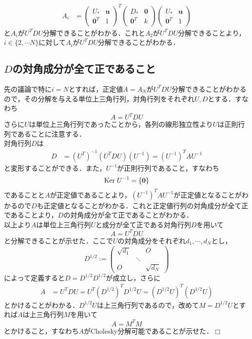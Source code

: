 \documentclass{jsarticle}
\theoremstyle{definition}
\theoremstyle{mystyle} %
\def\qed{\hfill$\Box$}
\begin{document}
\begin{align*}
A_i &=\begin{pmatrix}
U_{\ast}  & {\bm u}\\
{\bm 0}^T  & 1
\end{pmatrix}^T \begin{pmatrix}
D_{\ast} &{\bm 0}\\
{\bm 0}^T & k
\end{pmatrix}\begin{pmatrix}
U_{\ast}  & {\bm u}\\
{\bm 0}^T  & 1
\end{pmatrix}
\end{align*}
と$A_i$が$U^TDU$分解できることがわかる．これと$A_2$が$U^TDU$分解できることより，$i\in \{2,\cdots N\}$に対して$A_i$が$U^TDU$分解できることがわかる．\\

\subsection*{\Large $D$の対角成分が全て正であること}
先の議論で特に$i=N$とすれば，正定値$A=A_N$が$U^TDU$分解できることがわかるので，その分解を与える単位上三角行列，対角行列をそれぞれ$U,D$とする．すなわち
$$A=U^TDU$$
さらに$U$は単位上三角行列であったことから，各列の線形独立性より$U$は正則行列であることに注意する．\\

対角行列$D$は
\begin{align*}
D&=(U^T)^{-1}(U^T D U )(U^{-1})=(U^{-1})^TAU^{-1}
\end{align*}
と変形することができる．また，$U^{-1}$が正則行列であること，すなわち
$$ {\rm Ker}\;U^{-1}=\{{\bm 0}\}$$
であることと$A$が正定値であることより，$(U^{-1})^TAU^{-1}$が正定値となることがわかるので$D$も正定値となることがわかる．これと正定値行列の対角成分が全て正であることより，$D$の対角成分が全て正であることがわかる．\\

以上より$A$は単位上三角行列$U$と成分が全て正である対角行列$D$を用いて
$$A=U^T DU$$
と分解できることが示せた．ここで$U$の対角成分をそれぞれ$d_1,\cdots,d_N$とし，
$$D^{1/2}:=\begin{pmatrix}
\sqrt{d_1} &  & O\\
 & \ddots & \\
O & & \sqrt{d_N}
\end{pmatrix}$$
によって定義すると$D=D^{1/2}D^{1/2}$が成立し，さらに
\begin{align*}
A&=U^T DU=U^T (D^{1/2})^T D^{1/2}U=(D^{1/2} U)^T (D^{1/2}U)
\end{align*}
とかけることがわかる．$D^{1/2}U$は上三角行列であるので，改めて$M=D^{1/2}U$とすれば$A$は上三角行列$M$を用いて
$$A=M^T M$$
とかけること，すなわち$A$がCholesky分解可能であることが示せた．\qed
\end{document}

